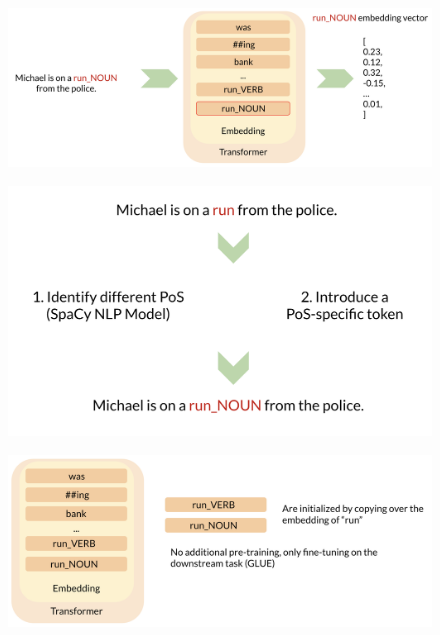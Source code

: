 \documentclass[a4paper,12pt,twoside,openright]{report}
\begin{document}
\begin{figure}[h]
	\center
  \includegraphics[width=\linewidth]{./assets/experiments/pipeline_tokenizer_BERnie_POS_input.png}
  \caption{}
  \label{fig:cbow_skipgram}
\end{figure}

\begin{figure}[h]
	\center
  \includegraphics[width=\linewidth]{./assets/experiments/pipeline_tokenizer_BERnie_POS_sentence.png}
  \caption{}
  \label{fig:cbow_skipgram}
\end{figure}

\begin{figure}[h]
	\center
  \includegraphics[width=\linewidth]{./assets/experiments/pipeline_model_BERnie_POS_initialization.png}
  \caption{}
  \label{fig:cbow_skipgram}
\end{figure}
\end{document}
